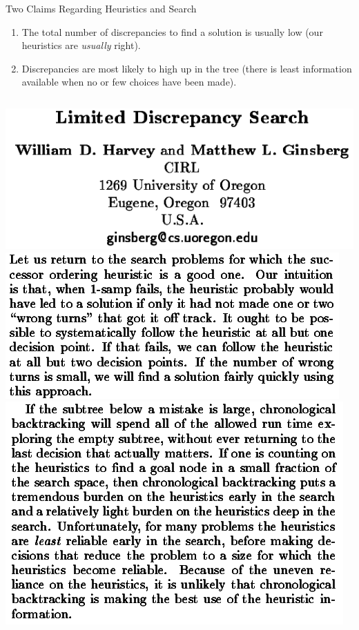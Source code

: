 \documentclass{beamer}
\begin{document}
\begin{frame}{Two Claims Regarding Heuristics and Search}

    \begin{enumerate}
        \item The total number of discrepancies to find a solution is usually low (our heuristics
            are \emph{usually} right).
        \item Discrepancies are most likely to high up in the tree (there is least
            information available when no or few choices have been made).
    \end{enumerate}

    \vspace{1em}

    \begin{columns}[T]
        \centering\includegraphics*[keepaspectratio=true,scale=0.18]{images/lds-paper.png}
        \centering\includegraphics*[keepaspectratio=true,scale=0.18]{images/lds-claim1.png}
        \centering\includegraphics*[keepaspectratio=true,scale=0.18]{images/lds-claim2.png}
    \end{columns}

\end{frame}
\end{document}
